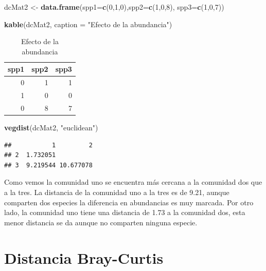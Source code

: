 \documentclass[]{book}
\newenvironment{Shaded}{\begin{snugshade}}{\end{snugshade}}
\newcommand{\KeywordTok}[1]{\textcolor[rgb]{0.13,0.29,0.53}{\textbf{{#1}}}}
\newcommand{\DataTypeTok}[1]{\textcolor[rgb]{0.13,0.29,0.53}{{#1}}}
\newcommand{\DecValTok}[1]{\textcolor[rgb]{0.00,0.00,0.81}{{#1}}}
\newcommand{\StringTok}[1]{\textcolor[rgb]{0.31,0.60,0.02}{{#1}}}
\newcommand{\NormalTok}[1]{{#1}}
\begin{document}
\begin{Shaded}
\begin{Highlighting}[]
\NormalTok{dcMat2 <-}\StringTok{ }\KeywordTok{data.frame}\NormalTok{(}\DataTypeTok{spp1=}\KeywordTok{c}\NormalTok{(}\DecValTok{0}\NormalTok{,}\DecValTok{1}\NormalTok{,}\DecValTok{0}\NormalTok{),}\DataTypeTok{spp2=}\KeywordTok{c}\NormalTok{(}\DecValTok{1}\NormalTok{,}\DecValTok{0}\NormalTok{,}\DecValTok{8}\NormalTok{),}
                    \DataTypeTok{spp3=}\KeywordTok{c}\NormalTok{(}\DecValTok{1}\NormalTok{,}\DecValTok{0}\NormalTok{,}\DecValTok{7}\NormalTok{))}

\KeywordTok{kable}\NormalTok{(dcMat2, }\DataTypeTok{caption =} \StringTok{"Efecto de la abundancia"}\NormalTok{)}
\end{Highlighting}
\end{Shaded}

\begin{table}

\caption{\label{tab:unnamed-chunk-11}Efecto de la abundancia}
\centering
\begin{tabular}[t]{r|r|r}
\hline
spp1 & spp2 & spp3\\
\hline
0 & 1 & 1\\
\hline
1 & 0 & 0\\
\hline
0 & 8 & 7\\
\hline
\end{tabular}
\end{table}

\begin{Shaded}
\begin{Highlighting}[]
\KeywordTok{vegdist}\NormalTok{(dcMat2, }\StringTok{"euclidean"}\NormalTok{)}
\end{Highlighting}
\end{Shaded}

\begin{verbatim}
##           1         2
## 2  1.732051          
## 3  9.219544 10.677078
\end{verbatim}

Como vemos la comunidad uno se encuentra más cercana a la comunidad dos
que a la tres. La distancia de la comunidad uno a la tres es de 9.21,
aunque comparten dos especies la diferencia en abundancias es muy
marcada. Por otro lado, la comunidad uno tiene una distancia de 1.73 a
la comunidad dos, esta menor distancia se da aunque no comparten ninguna
especie.

\section{Distancia Bray-Curtis}\label{distancia-bray-curtis}
\end{document}

